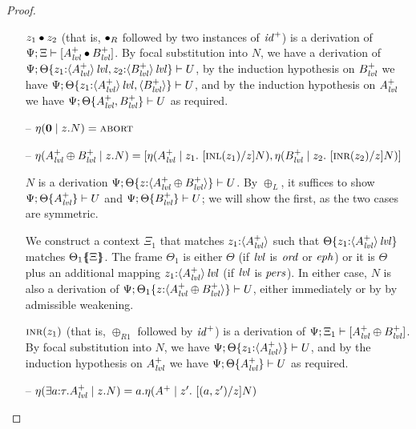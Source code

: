 \begin{proof}
\begin{itemize}
  $\tfuser{z_1}{z_2}$ (that is, ${\fuse}_R$ followed by two instances of 
  ${\it id}^+$) is a derivation of 
  $\foc{\Psi}{\Xi}{[A^+_\mlvl \fuse B^+_\mlvl]}$.
  By focal substitution into $N$, we have
  a derivation of 
  $\foc{\Psi}{\tackon{\Theta}
              {\mkconj{z_1{:}\islvl{\susp{A^+_\mlvl}}}
                      {z_2{:}\islvl{\susp{B^+_\mlvl}}}}}{U}$,
  by the induction hypothesis on $B^+_\mlvl$ we have
  $\foc{\Psi}{\tackon{\Theta}
              {\mkconj{z_1{:}\islvl{\susp{A^+_\mlvl}}}
                      {\susp{B^+_\mlvl}}}}{U}$, and by
  the induction hypothesis on $A^+_\mlvl$ we have
   $\foc{\Psi}{\tackon{\Theta}
              {\mkconj{A^+_\mlvl}
                      {B^+_\mlvl}}}{U}$ as required.
  \smallskip
 

\item[--] $\etapa{z}{N}{\zero} = \tabort$ 

\item[--] $\etapa{z}{N}{A^+_\mlvl \oplus B^+_\mlvl} = 
           \toplusl
            {\etapa{z_1}{~[\tinl{z_1}/z]N}{A^+_\mlvl}}
            {\etapa{z_2}{~[\tinr{z_2}/z]N}{B^+_\mlvl}}$
\smallskip

$N$ is a derivation 
$\foc{\Psi}{\tackon{\Theta}{z{:}\susp{A^+_\mlvl \oplus B^+_\mlvl}}}{U}$.
By $\oplus_L$, it suffices to show 
$\foc{\Psi}{\tackon{\Theta}{A^+_\mlvl}}{U}$
and
$\foc{\Psi}{\tackon{\Theta}{B^+_\mlvl}}{U}$; we will show the first, as the
two cases are symmetric. 
\smallskip

We construct a context $\Xi_1$ that matches $z_1{:}\susp{A^+_\mlvl}$
such that $\tackon{\Theta}{z_1{:}\islvl{\susp{A^+_\mlvl}}}$ matches
$\frameoff{\Theta_1}{\Xi}$. The frame $\Theta_1$ is either 
$\Theta$ (if $\mlvl$ is $\mtrue$ or $\meph$) or it is $\Theta$
plus an additional mapping $z_1{:}\islvl{\susp{A^+_\mlvl}}$ (if
$\mlvl$ is $\mpers$). In either case, $N$ is also a derivation
of $\foc{\Psi}{\tackon{\Theta_1}{z{:}\susp{A^+_\mlvl \oplus B^+_\mlvl}}}{U}$,
either immediately or by by admissible weakening.
\smallskip

$\tinr{z_1}$ (that is, $\oplus_{R1}$ followed by ${\it id}^+$) is a
derivation of $\foc{\Psi}{\Xi_1}{[A^+_\mlvl \oplus B^+_\mlvl]}$.  By
focal substitution into $N$, we have 
$\foc{\Psi}{\tackon{\Theta}{z_1{:}\susp{A^+_\mlvl}}}{U}$, and by the
induction hypothesis on $A^+_\mlvl$ we have 
$\foc{\Psi}{\tackon{\Theta}{A^+_\mlvl}}{U}$ as required.
\smallskip

\item[--] $\etapa{z}{N}{\exists a{:}\tau. A^+_\mlvl} 
           = \texistsl{a}
              {\etapa{z'}
                {~[(\texistsr{a}{z'})/z]N}
                {A^+}}$ 
\smallskip


\end{itemize}
\end{proof}
